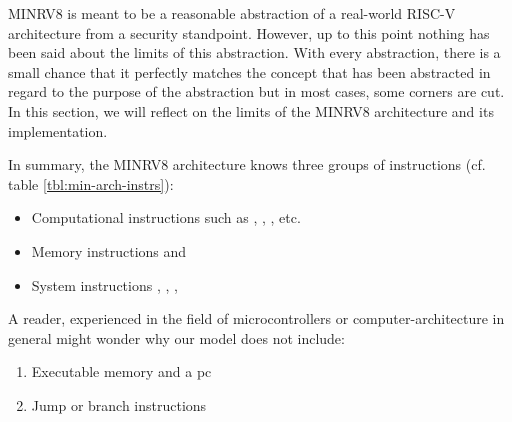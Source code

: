 MINRV8 is meant to be a reasonable abstraction of a real-world RISC-V architecture from a security standpoint.
However, up to this point nothing has been said about the limits of this abstraction.
With every abstraction, there is a small chance that it perfectly matches the concept that has been abstracted in regard to the purpose of the abstraction but in most cases, some corners are cut.
In this section, we will reflect on the limits of the MINRV8 architecture and its implementation.

In summary, the MINRV8 architecture knows three groups of instructions (cf. table \ref{tbl:min-arch-instrs}):
\begin{itemize}
    \item Computational instructions such as , , , etc.
    \item Memory instructions  and 
    \item System instructions , , , 
\end{itemize}

A reader, experienced in the field of microcontrollers or computer-architecture in general might wonder why our model does not include:
\begin{enumerate}
    \item Executable memory and a \gls{pc}
    \item Jump or branch instructions
\end{enumerate}

